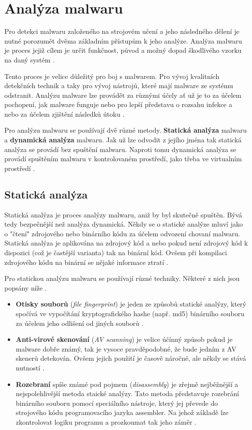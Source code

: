\section{Analýza malwaru}
Pro detekci malwaru založeného na strojovém učení a jeho následného dělení je nutné porozumět dvěma základním přístupům k jeho analýze. Analýza malwaru je proces jejiž cílem je určit funkčnost, původ a možný dopad škodlivého vzorku na daný systém \cite{analysis_wiki}.

Tento proces je velice důležitý pro boj s malwarem. Pro vývoj kvalitních detekčních technik a taky pro vývoj nástrojů, které mají malware ze systému odstranit. Analýzu malware lze provádět za různými účely ať už je to za účelem pochopení, jak malware funguje
nebo pro lepší představu o rozsahu infekce a nebo za účelem zjištění následků útoku \cite{article_analysis_goat}.

Pro analýzu malwaru se používají dvě různé metody. \textbf{Statická analýza} malwaru a \textbf{dynamická analýza} malwaru. 
Jak už lze odvodit z jejího jména tak statická analýza se provádí bez spuštění malwaru. Naproti tomu dynamická analýza se provádí spuštěním malwaru v kontrolovaném prostředí, 
jako třeba ve virtualním prostředí \cite{article_analysis}.

\subsection*{Statická analýza}
Statická analýza je proces analýzy malwaru, aniž by byl skutečně spuštěn. Bývá tedy bezpečnější než analýza dynamická. Někdy se o statické analýze mluví jako o "čtení" zdrojového nebo binárního kódu za účelem
odvození chovaní malwaru. Statická analýza je aplikována na zdrojový kód a nebo pokud není zdrojový kód k dispozici (což je častější varianta) tak na binární kód. Ovšem při kompilaci zdrojového kódu na binární se nějaké informace ztratí \cite{article_analysis_goat,static_analysis}.

Pro statickou analýzu malwaru se používají různé techniky. Některé z nich jsou popsány níže \cite{malware_d_s}.
\begin{itemize}
    \item \textbf{Otisky souborů} (\textit{file fingerprint}) je jeden ze způsobů statické analýzy, který spočívá ve vypočítání kryptografického hashe (např. md5) binárního souboru za účelem jeho odlišení od jiných souborů \cite{static_analysis}.
    \item \textbf{Anti-virové skenování} (\textit{AV scanning}) je velice účínný způsob pokud je malware dobře známý, tak je vysoce pravděpodobné, že bude jedním z AV skenerů detekován. Ovšem jejich použití je časově náročné, ale někdy se stává nutností \cite{article_analysis_goat}.
    \item \textbf{Rozebraní} spíše známé pod pojmem (\textit{disassembly}) je zřejmě nejběžnější a nejspolehlivější metoda staické analýzy. Tato metoda představuje rozebrání binárního souboru pomocí speciálního nástroje, který jej převede do strojového kódu programovacího jazyka assembler. Na jehož základě lze zkontrolovat logiku programu a prozkoumat tak jeho záměr \cite{article_analysis_goat}. 
\end{itemize}

